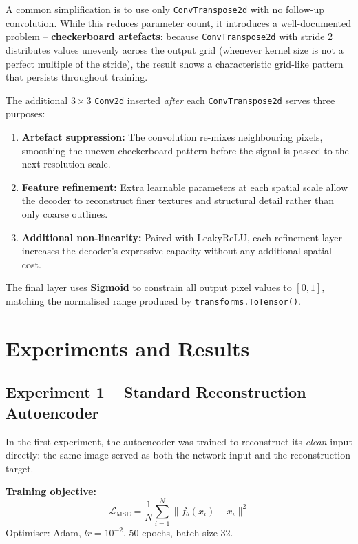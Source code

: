 \documentclass[12pt,a4paper]{article}
\begin{document}
A common simplification is to use only \texttt{ConvTranspose2d} with no
follow-up convolution. While this reduces parameter count, it introduces a
well-documented problem -- \textbf{checkerboard artefacts}: because
\texttt{ConvTranspose2d} with stride 2 distributes values unevenly across the
output grid (whenever kernel size is not a perfect multiple of the stride),
the result shows a characteristic grid-like pattern that persists throughout
training.

The additional $3\times3$ \texttt{Conv2d} inserted \emph{after} each
\texttt{ConvTranspose2d} serves three purposes:

\begin{enumerate}[leftmargin=*, itemsep=3pt]
  \item \textbf{Artefact suppression:} The convolution re-mixes neighbouring
        pixels, smoothing the uneven checkerboard pattern before the signal
        is passed to the next resolution scale.
  \item \textbf{Feature refinement:} Extra learnable parameters at each
        spatial scale allow the decoder to reconstruct finer textures and
        structural detail rather than only coarse outlines.
  \item \textbf{Additional non-linearity:} Paired with LeakyReLU, each
        refinement layer increases the decoder's expressive capacity without
        any additional spatial cost.
\end{enumerate}

The final layer uses \textbf{Sigmoid} to constrain all output pixel values to
$[0,1]$, matching the normalised range produced by
\texttt{transforms.ToTensor()}.


\newpage
\section{Experiments and Results}

\subsection{Experiment 1 -- Standard Reconstruction Autoencoder}

In the first experiment, the autoencoder was trained to reconstruct its
\emph{clean} input directly: the same image served as both the network input
and the reconstruction target.

\begin{mdframed}[backgroundcolor=lightgray, linecolor=accentblue, linewidth=0.8pt,
                 innerleftmargin=10pt, innerrightmargin=10pt,
                 innertopmargin=6pt, innerbottommargin=6pt]
\textbf{Training objective:}
\[
  \mathcal{L}_{\text{MSE}} = \frac{1}{N}\sum_{i=1}^{N}
    \bigl\| f_\theta(x_i) - x_i \bigr\|^2
\]
Optimiser: Adam, $lr=10^{-2}$, 50 epochs, batch size 32.
\end{mdframed}
\end{document}
